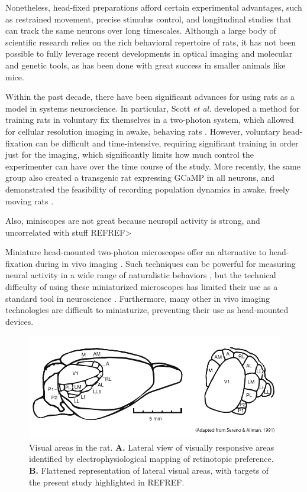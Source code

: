 Nonetheless, head-fixed preparations afford certain experimental advantages, such as restrained movement, precise stimulus control, and longitudinal studies that can track the same neurons over long timescales. Although a large body of scientific research relies on the rich behavioral repertoire of rats, it has not been possible to fully leverage recent developments in optical imaging and molecular and genetic tools, as has been done with great success in smaller animals like mice. 

Within the past decade, there have been significant advances for using rats as a model in systems neuroscience. In particular, Scott \textit{et al.} developed a method for training rats in voluntary fix themselves in a two-photon system, which allowed for cellular resolution imaging in awake, behaving rats \cite{Scott2013}. However, voluntary head-fixation can be difficult and time-intensive, requiring significant training in order just for the imaging, which significantly limits how much control the experimenter can have over the time course of the study. More recently, the same group also created a transgenic rat expressing GCaMP in all neurons, and demonstrated the feasibility of recording population dynamics in awake, freely moving rats \cite{Scott2018ImagingMacroscope}. 

Also, miniscopes are not great because neuropil activity is strong, and uncorrelated with stuff REFREF>

Miniature head-mounted two-photon microscopes offer an alternative to head-fixation during in vivo imaging \cite{Helmchen2001, Piyawattanametha2009, Sawinski2009}. Such techniques can be powerful for measuring neural activity in a wide range of naturalistic behaviors \cite{Sawinski2009}, but the technical difficulty of using these miniaturized microscopes has limited their use as a standard tool in neuroscience \cite{Kerr2012}. Furthermore, many other in vivo imaging technologies are difficult to miniaturize, preventing their use as head-mounted devices. 

\begin{figure}[t!]
    \includegraphics[width=\textwidth]{figures/chapter_2/fig_2-1_rat_visual_areas/rat_visual_areas.pdf}
    \vspace{.1in}
    \caption[Visual areas in the rat]{Visual areas in the rat. \textbf{A.} Lateral view of visually responsive areas identified by electrophysiological mapping of retinotopic preference. \textbf{B.} Flattened representation of lateral visual areas, with targets of the present study highlighted in REFREF. 
    \label{fig:rat_visual_areas}}
\end{figure}

